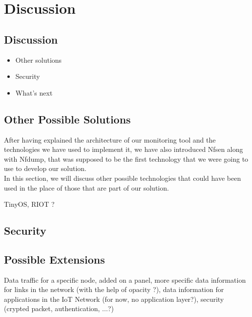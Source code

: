 \part{Discussion} \label{part:discussion}
\chapter{Discussion} 

\begin{itemize}
	\item Other solutions
	\item Security
	\item What's next
\end{itemize}



\newpage
\chapter{Other Possible Solutions}

After having explained the architecture of our monitoring tool and the technologies we have used to implement it, we have also introduced Nfsen along with Nfdump, that was supposed to be the first technology that we were going to use to develop our solution.\\

In this section, we will discuss other possible technologies that could have been used in the place of those that are part of our solution.

TinyOS, RIOT ? 
\newpage
\chapter{Security}

\newpage
\chapter{Possible Extensions}


Data traffic for a specific node, added on a panel, more specific data information for links in the network (with the help of opacity ?), data information for applications in the IoT Network (for now, no application layer?), security (crypted packet, authentication, ...?) 
